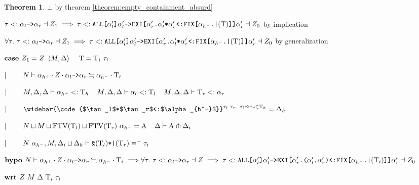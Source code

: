 \documentclass[acmsmall]{acmart}
\theoremstyle{definition}
\newtheorem{theorem}{Theorem}[section]
\begin{document}
\begin{theorem}
        \item \Z\Z\Z\Z $\bot$ by theorem \ref{theorem:empty_containment_absurd}
      \item \Z\Z\Z $
        \tau <: \texttt{$\alpha_l$->$\alpha_r$} \dashv Z_1
        \implies
        \tau
        <:
        \texttt{ALL[$\alpha_l'$]$\alpha_l'$->EXI[$\alpha_r'$.$\alpha_l'$*$\alpha_r'$<:FIX[$\alpha_{h^-}$.|$(\mathrm{T})$]]$\alpha_r'$} 
        \dashv Z_0
      $ by implication
    \item \Z\Z $
      \forall \tau .\ 
      \tau \subtypes \code{$\alpha_l$->$\alpha_r$} \given Z_1
      \implies
      \tau
      \subtypes
      \code{ALL[$\alpha_l'$]$\alpha_l'$->EXI[$\alpha_r'$.$\alpha_l'$*$\alpha_r'$<:FIX[$\alpha_{h^-}$.|$(\Tau)$]]$\alpha_r'$} 
      \given Z_0
    $ by generalization 
  \item \Z $\B{case }
    Z_1 = Z\ \left<M, \Delta \right> \I \Tau = \Tau_i\ \tau_i
  $
  \item \Z $|\ \ \ \ \ \ \ 
    N \vdash 
    \alpha_{h^+} \cdot Z \cdot \texttt{$\alpha_l$->$\alpha_r$} 
    \fallingdotseq 
    \alpha_{h^-} \cdot \mathrm{T}_i
  $
  \item \Z $|\ \ \ \ \ \ \ 
    M, \Delta, \Delta \vdash \alpha_{h^+} <: \mathrm{T}_h
    \hspace{4mm}
    M, \Delta, \Delta \vdash \alpha_l <: \mathrm{T}_l 
    \hspace{4mm}
    M, \Delta, \Delta \vdash \mathrm{T}_r <: \alpha_r
  $
  \item \Z $\contin
    \widebar{\code{$\tau_l$*$\tau_r$<:$\alpha_{h^-}$}}^{\tau_l\ \tau_r .\ \tau_l\code{->}\tau_r \in \Tau_h} = \Delta_h
  $
  \item \Z $\contin
    N \sqcup M \sqcup \text{FTV}(\Tau_l) \sqcup \text{FTV}(\Tau_r)\ \alpha_{h^-} = \Alpha 
    \I
    \Delta \entails \Alpha \pitchfork \Delta_i  
  $
  \item \Z $|\ \ \ \ \ \ \ 
    N\ \alpha_{h^-}, M, \Delta_i \sqcup \Delta_h \vdash \texttt{\&$(\mathrm{T}_l)$*|$(\mathrm{T}_r)$} \equiv^{-} \tau_i
  $
  \item \Z $\B{hypo }
    N \entails 
    \alpha_{h^+} \cdot Z \cdot \code{$\alpha_l$->$\alpha_r$} 
    \fallingdotseq 
    \alpha_{h^-} \cdot \Tau_i
    \implies
    \\
    \forall \tau .\ 
    \tau \subtypes \code{$\alpha_l$->$\alpha_r$} \given Z
    \implies
    \tau
    \subtypes
    \code{ALL[$\alpha_l'$]$\alpha_l'$->EXI[$\alpha_r'$.($\alpha_l'$,$\alpha_r'$)<:FIX[$\alpha_{h^-}$.|$(\Tau_i)$]]$\alpha_r'$} 
    \given Z_0
  $
  \item \Z $\textbf{wrt }
    Z\ M\ \Delta\ \mathrm{T}_i\ \tau_i
  $


\end{theorem}
\end{document}
